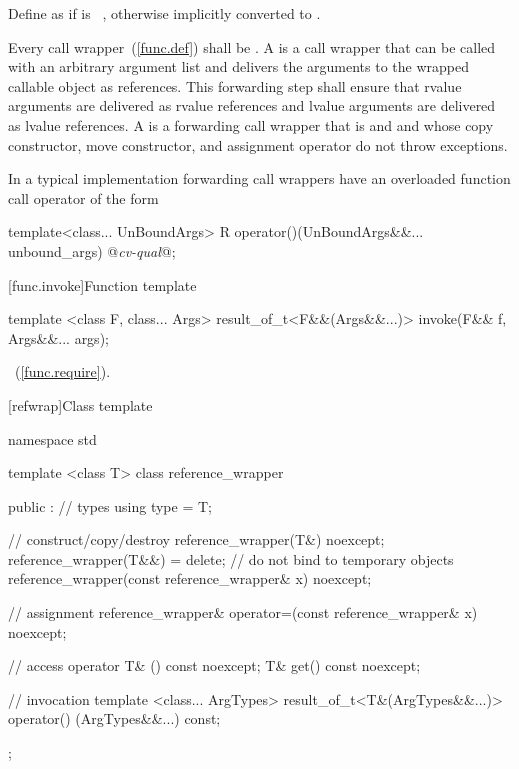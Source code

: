 \pnum
{}%
Define  as
if  is \cv{}~, otherwise
 implicitly converted
to .

\pnum
{}%
%
%
%
%
Every call wrapper~(\ref{func.def}) shall be
.
A  is a
call wrapper that can be called with an arbitrary argument list
and delivers the arguments to the wrapped callable object as references.
This forwarding step shall ensure that rvalue arguments are delivered as rvalue references
and lvalue arguments are delivered as lvalue references.
A  is a forwarding call wrapper that is
 and  and
whose copy constructor, move constructor, and assignment operator
do not throw exceptions.
\begin{note} In a typical implementation
forwarding call wrappers have an overloaded function call
operator of
the form

\begin{codeblock}
template<class... UnBoundArgs>
R operator()(UnBoundArgs&&... unbound_args) @\textit{cv-qual}@;
\end{codeblock}
\end{note}

[func.invoke]{Function template }
%
%
\begin{itemdecl}
template <class F, class... Args>
  result_of_t<F&&(Args&&...)> invoke(F&& f, Args&&... args);
\end{itemdecl}

\begin{itemdescr}
\pnum
\returns
{}~(\ref{func.require}).
\end{itemdescr}

[refwrap]{Class template }

%
%
\begin{codeblock}
namespace std {
  template <class T> class reference_wrapper {
  public :
    // types
    using type = T;

    // construct/copy/destroy
    reference_wrapper(T&) noexcept;
    reference_wrapper(T&&) = delete;     // do not bind to temporary objects
    reference_wrapper(const reference_wrapper& x) noexcept;

    // assignment
    reference_wrapper& operator=(const reference_wrapper& x) noexcept;

    // access
    operator T& () const noexcept;
    T& get() const noexcept;

    // invocation
    template <class... ArgTypes>
    result_of_t<T&(ArgTypes&&...)>
    operator() (ArgTypes&&...) const;
  };
}
\end{codeblock}

